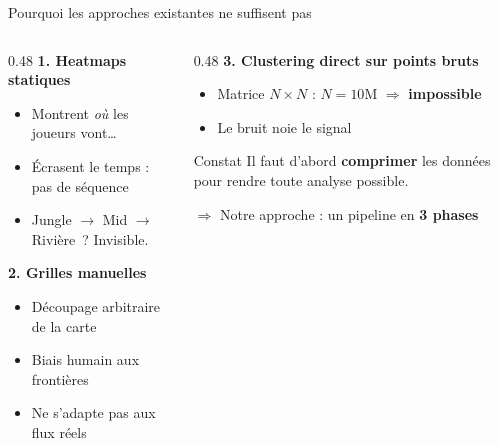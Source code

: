 \documentclass[aspectratio=169, 11pt]{beamer}
\begin{document}
\begin{frame}{Pourquoi les approches existantes ne suffisent pas}

\begin{columns}[T]
\begin{column}{0.48\textwidth}
    \textbf{1. Heatmaps statiques}
    \begin{itemize}
        \item Montrent \textit{où} les joueurs vont\ldots
        \item \textcolor{dota_accent}{Écrasent le temps} : pas de séquence
        \item Jungle $\to$ Mid $\to$ Rivière\ ? Invisible.
    \end{itemize}

    \vspace{0.3cm}
    \textbf{2. Grilles manuelles}
    \begin{itemize}
        \item Découpage arbitraire de la carte
        \item \textcolor{dota_accent}{Biais humain} aux frontières
        \item Ne s'adapte pas aux flux réels
    \end{itemize}
\end{column}
\begin{column}{0.48\textwidth}
    \textbf{3. Clustering direct sur points bruts}
    \begin{itemize}
        \item Matrice $N \times N$ : $N = 10$M $\Rightarrow$ \textcolor{dota_accent}{\textbf{impossible}}
        \item Le bruit noie le signal
    \end{itemize}

    \vspace{0.4cm}
    \begin{alertblock}{Constat}
    Il faut d'abord \textbf{comprimer} les données pour rendre toute analyse possible.
    \end{alertblock}

    \vspace{0.2cm}
    $\Rightarrow$ Notre approche : un pipeline en \textbf{3 phases}
\end{column}
\end{columns}

\end{frame}
\end{document}
